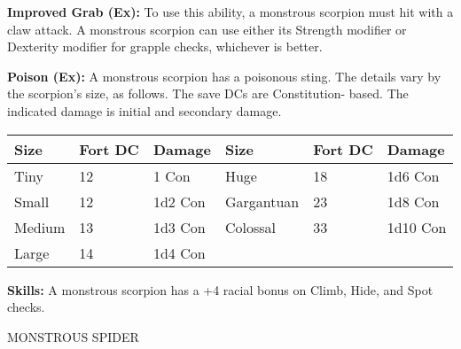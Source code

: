 \documentclass{article}
\begin{document}
\textbf{Improved Grab (Ex):} To use this ability, a monstrous scorpion must hit 
with a claw attack. A monstrous scorpion can use either its Strength modifier or 
Dexterity modifier for grapple checks, whichever is better.

\textbf{Poison (Ex):} A monstrous scorpion has a poisonous sting. The details vary 
by the scorpion's size, as follows. The save DCs are Constitution- based. The indicated 
damage is initial and secondary damage.

\begin{tabular}{|>{\raggedright}p{32pt}|>{\raggedright}p{34pt}|>{\raggedright}p{33pt}|>{\raggedright}p{45pt}|>{\raggedright}p{34pt}|>{\raggedright}p{38pt}|}
\hline
S\textbf{ize} & F\textbf{ort DC} & D\textbf{amage} & S\textbf{ize} & F\textbf{ort 
DC} & D\textbf{amage}\tabularnewline
\hline
Tiny & 12 & 1 Con & Huge & 18 & 1d6 Con\tabularnewline
\hline
Small & 12 & 1d2 Con & Gargantuan & 23 & 1d8 Con\tabularnewline
\hline
Medium & 13 & 1d3 Con & Colossal & 33 & 1d10 Con\tabularnewline
\hline
Large & 14 & 1d4 Con &  &  & \tabularnewline
\hline
\end{tabular}

\textbf{Skills:} A monstrous scorpion has a +4 racial bonus on Climb, Hide, and 
Spot checks.

\vspace{12pt}
MONSTROUS SPIDER
\end{document}
